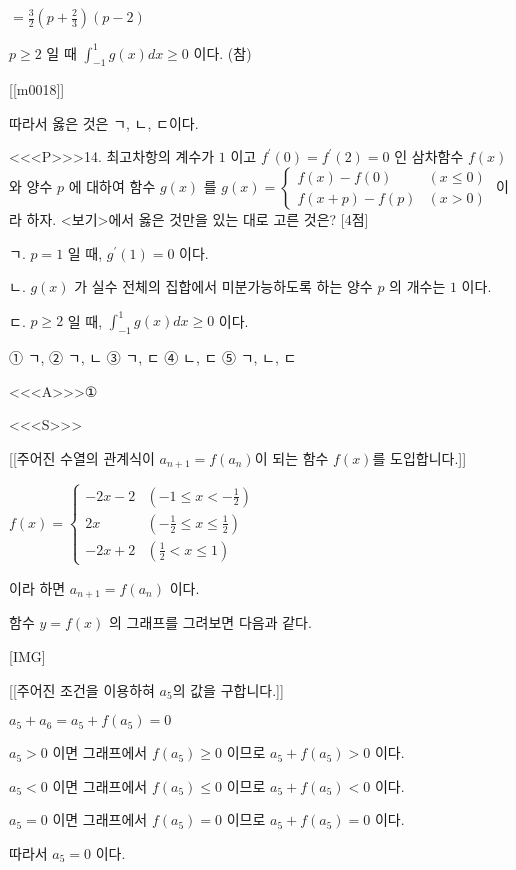 \documentclass{oblivoir}
\begin{document}
$=\frac{3}{2}\left(p+\frac{2}{3}\right)(p-2)$

$p \geq 2 $ 일 때 $\int_{-1}^{1} g(x) d x \geq 0 $ 이다. (참)

[[m0018]]

따라서 옳은 것은 ㄱ, ㄴ, ㄷ이다.


<<<P>>>14. 최고차항의 계수가 $1$ 이고 $f^{\prime}(0)=f^{\prime}(2)=0$ 인 삼차함수 $f(x)$ 와 양수 $p$ 에 대하여 함수 $g(x)$ 를
$g(x)= \begin{cases}f(x)-f(0) & (x \leq 0) \\ f(x+p)-f(p) & (x>0)\end{cases}$
이라 하자. <보기>에서 옳은 것만을 있는 대로 고른 것은? [4점]

ㄱ. $p=1$ 일 때, $g^{\prime}(1)=0$ 이다.

ㄴ. $g(x)$ 가 실수 전체의 집합에서 미분가능하도록 하는 양수 $p$ 의 개수는 $1$ 이다.

ㄷ. $p \geq 2$ 일 때, $\int_{-1}^{1} g(x) d x \geq 0$ 이다.

① ㄱ,
② ㄱ, ㄴ
③ ㄱ, ㄷ
④ ㄴ, ㄷ
⑤ ㄱ, ㄴ, ㄷ


<<<A>>>①

<<<S>>>

[[주어진 수열의 관계식이 $a_{n+1}=f\left(a_{n}\right)$이 되는 함수 $f(x)$를 도입합니다.]]

$f(x)=\left\{\begin{array}{cl}-2 x-2 & \left(-1 \leq x<-\frac{1}{2}\right) \\ 2 x & \left(-\frac{1}{2} \leq x \leq \frac{1}{2}\right) \\ -2 x+2 & \left(\frac{1}{2} < x \leq 1\right)\end{array}\right.$

이라 하면 $a_{n+1}=f\left(a_{n}\right)$ 이다.

함수 $y=f(x)$ 의 그래프를 그려보면 다음과 같다.

[IMG]

[[주어진 조건을 이용하혀 $a_{5}$의 값을 구합니다.]]

$a_{5}+a_{6}=a_{5}+f\left(a_{5}\right)=0$

$a_{5}>0 $ 이면 그래프에서 $ f\left(a_{5}\right) \geq 0 $ 이므로 $a_{5}+f\left(a_{5}\right)>0 $ 이다.

$a_{5}<0 $ 이면 그래프에서 $f\left(a_{5}\right) \leq 0 $ 이므로 $a_{5}+f\left(a_{5}\right)<0 $ 이다.

$a_{5}=0 $ 이면 그래프에서 $f\left(a_{5}\right)=0 $ 이므로 $a_{5}+f\left(a_{5}\right)=0 $ 이다.

따라서 $a_{5}=0$ 이다.
\end{document}
